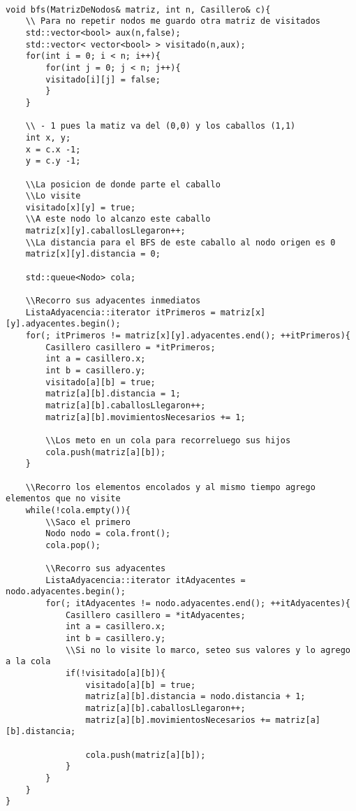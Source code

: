 \begin{lstlisting}

void bfs(MatrizDeNodos& matriz, int n, Casillero& c){
	\\ Para no repetir nodos me guardo otra matriz de visitados
	std::vector<bool> aux(n,false);
	std::vector< vector<bool> > visitado(n,aux);
	for(int i = 0; i < n; i++){
		for(int j = 0; j < n; j++){
		visitado[i][j] = false;
		}
	}

	\\ - 1 pues la matiz va del (0,0) y los caballos (1,1)
	int x, y;
	x = c.x -1;
	y = c.y -1;

	\\La posicion de donde parte el caballo
	\\Lo visite
	visitado[x][y] = true;
	\\A este nodo lo alcanzo este caballo
	matriz[x][y].caballosLlegaron++;
	\\La distancia para el BFS de este caballo al nodo origen es 0
	matriz[x][y].distancia = 0;

	std::queue<Nodo> cola;

	\\Recorro sus adyacentes inmediatos
	ListaAdyacencia::iterator itPrimeros = matriz[x][y].adyacentes.begin();
	for(; itPrimeros != matriz[x][y].adyacentes.end(); ++itPrimeros){
		Casillero casillero = *itPrimeros;
		int a = casillero.x;
		int b = casillero.y;
		visitado[a][b] = true;
		matriz[a][b].distancia = 1;
		matriz[a][b].caballosLlegaron++;
		matriz[a][b].movimientosNecesarios += 1;

		\\Los meto en un cola para recorreluego sus hijos
		cola.push(matriz[a][b]);
	}

	\\Recorro los elementos encolados y al mismo tiempo agrego elementos que no visite
	while(!cola.empty()){
		\\Saco el primero
		Nodo nodo = cola.front();
		cola.pop();

		\\Recorro sus adyacentes
		ListaAdyacencia::iterator itAdyacentes = nodo.adyacentes.begin();
		for(; itAdyacentes != nodo.adyacentes.end(); ++itAdyacentes){
			Casillero casillero = *itAdyacentes;
			int a = casillero.x;
			int b = casillero.y;
			\\Si no lo visite lo marco, seteo sus valores y lo agrego a la cola
			if(!visitado[a][b]){
				visitado[a][b] = true;
				matriz[a][b].distancia = nodo.distancia + 1;
				matriz[a][b].caballosLlegaron++;
				matriz[a][b].movimientosNecesarios += matriz[a][b].distancia;

				cola.push(matriz[a][b]);
			}
		}
	}
}

\end{lstlisting}